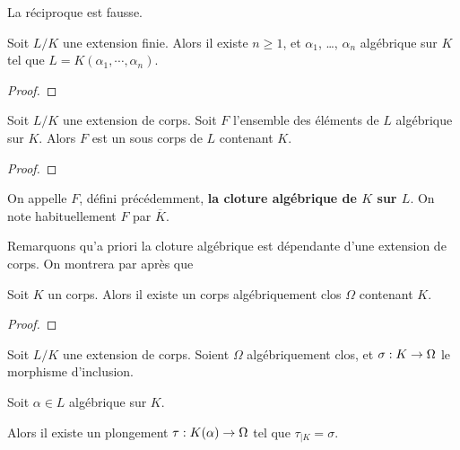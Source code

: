 \begin{remarque}
	La réciproque est fausse.
\end{remarque}

\begin{proposition}
	Soit $L/K$ une extension finie. Alors il existe $n \geq 1$, et $\alpha_{1}$,
	\ldots, $\alpha_{n}$ algébrique sur $K$ tel que $L = K(\alpha_{1}, \cdots,
	\alpha_{n})$.
\end{proposition}

\ifdefined\outputproof
\begin{proof}

\end{proof}
\fi

\begin{proposition}
	Soit $L/K$ une extension de corps.
	Soit $F$ l'ensemble des éléments de $L$ algébrique sur $K$.
	Alors $F$ est un sous corps de $L$ contenant $K$.
\end{proposition}

\ifdefined\outputproof
\begin{proof}

\end{proof}
\fi

\begin{definition}
	On appelle $F$, défini précédemment, \textbf{la cloture algébrique de $K$
	sur $L$}.
	On note habituellement $F$ par $\overline{K}$.
\end{definition}

Remarquons qu'a priori la cloture algébrique est dépendante d'une extension de
corps. On montrera par après que

\begin{theorem}
	Soit $K$ un corps. Alors il existe un corps algébriquement clos $\Omega$
	contenant $K$.
\end{theorem}

\ifdefined\outputproof
\begin{proof}

\end{proof}
\fi

\begin{lemma}
	Soit $L/K$ une extension de corps. Soient $\Omega$ algébriquement clos, et
	$\sigma : K \rightarrow \Omega$ le morphisme d'inclusion.

	Soit $\alpha \in L$ algébrique sur $K$.

	Alors il existe un plongement $\tau : K(\alpha) \rightarrow \Omega$ tel que
	$\tau_{|K} = \sigma$.
\end{lemma}


